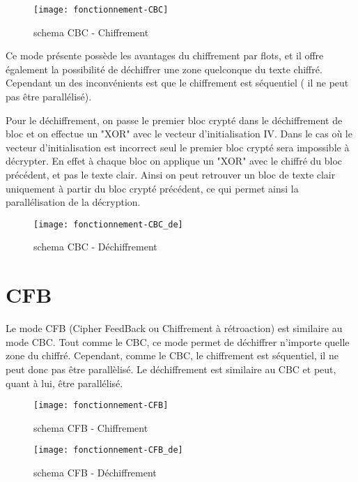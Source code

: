 \begin{figure}[!h]
  \centering
  \texttt{[image: fonctionnement-CBC]}
  \caption{schema CBC - Chiffrement \cite{wiki}}
  \label{schema CBC - Chiffrement}
\end{figure}

Ce mode présente possède les avantages du chiffrement par flots, et il offre également la possibilité de déchiffrer une zone quelconque du texte chiffré. Cependant un des inconvénients est que le chiffrement est séquentiel ( \cad il ne peut pas être parallélisé).

Pour le déchiffrement, on passe le premier bloc crypté dans le déchiffrement de bloc et on effectue un "XOR" avec le vecteur d'initialisation IV. Dans le cas où le vecteur d'initialisation est incorrect seul le premier bloc crypté sera impossible à décrypter. En effet à chaque bloc on applique un "XOR" avec le chiffré du bloc précédent, et pas le texte clair. Ainsi on peut retrouver un bloc de texte clair uniquement à partir du bloc crypté précédent, ce qui permet ainsi la parallélisation de la décryption. 

\begin{figure}[!h]
  \centering
  \texttt{[image: fonctionnement-CBC\_de]}
  \caption{schema CBC - Déchiffrement}
  \label{schema CBC - Déchiffrement}
\end{figure}




\section{CFB}
Le mode CFB (Cipher FeedBack ou Chiffrement à rétroaction) est similaire au mode CBC. Tout comme le CBC, ce mode permet de déchiffrer n'importe quelle zone du chiffré. Cependant, comme le CBC, le chiffrement est séquentiel, il ne peut donc pas être parallèlisé. Le déchiffrement est similaire au CBC et peut, quant à lui, être parallélisé. 

\begin{figure}[!h]
  \centering
  \texttt{[image: fonctionnement-CFB]}
  \caption{schema CFB - Chiffrement}
  \label{schema CFB - Chiffrement}
\end{figure}

\begin{figure}[!h]
  \centering
  \texttt{[image: fonctionnement-CFB\_de]}
  \caption{schema CFB - Déchiffrement}
  \label{schema CFB - Déchiffrement}
\end{figure}

